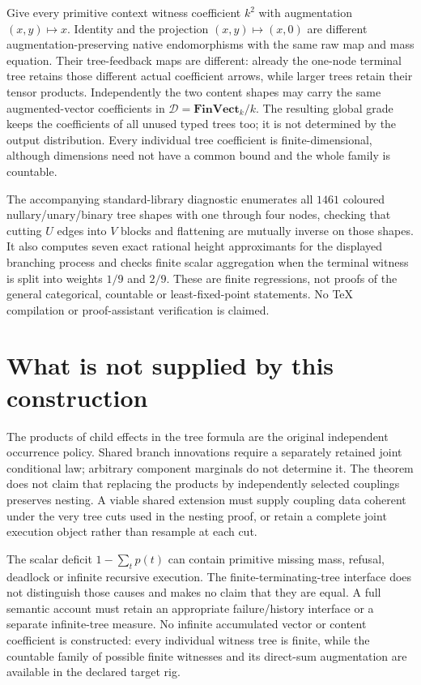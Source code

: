 \documentclass[11pt]{article}
\begin{document}
Give every primitive context witness coefficient $k^2$ with augmentation $(x,y)\mapsto x$. Identity and the projection $(x,y)\mapsto(x,0)$ are different augmentation-preserving native endomorphisms with the same raw map and mass equation. Their tree-feedback maps are different: already the one-node terminal tree retains those different actual coefficient arrows, while larger trees retain their tensor products. Independently the two content shapes may carry the same augmented-vector coefficients in $\mathcal D=\mathbf{FinVect}_k/k$. The resulting global grade keeps the coefficients of all unused typed trees too; it is not determined by the output distribution. Every individual tree coefficient is finite-dimensional, although dimensions need not have a common bound and the whole family is countable.

The accompanying standard-library diagnostic enumerates all $1461$ coloured nullary/unary/binary tree shapes with one through four nodes, checking that cutting $U$ edges into $V$ blocks and flattening are mutually inverse on those shapes. It also computes seven exact rational height approximants for the displayed branching process and checks finite scalar aggregation when the terminal witness is split into weights $1/9$ and $2/9$. These are finite regressions, not proofs of the general categorical, countable or least-fixed-point statements. No TeX compilation or proof-assistant verification is claimed.

\section{What is not supplied by this construction}
The products of child effects in the tree formula are the original independent occurrence policy. Shared branch innovations require a separately retained joint conditional law; arbitrary component marginals do not determine it. The theorem does not claim that replacing the products by independently selected couplings preserves nesting. A viable shared extension must supply coupling data coherent under the very tree cuts used in the nesting proof, or retain a complete joint execution object rather than resample at each cut.

The scalar deficit $1-\sum_tp(t)$ can contain primitive missing mass, refusal, deadlock or infinite recursive execution. The finite-terminating-tree interface does not distinguish those causes and makes no claim that they are equal. A full semantic account must retain an appropriate failure/history interface or a separate infinite-tree measure. No infinite accumulated vector or content coefficient is constructed: every individual witness tree is finite, while the countable family of possible finite witnesses and its direct-sum augmentation are available in the declared target rig.
\end{document}
